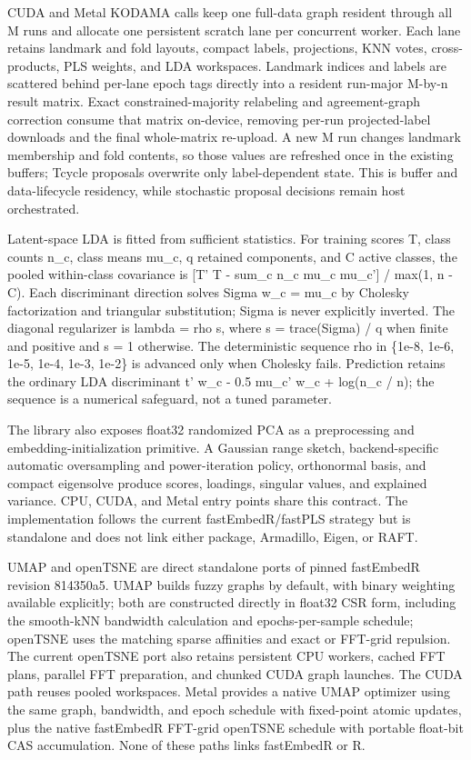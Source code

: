 \documentclass[twoside,11pt]{article}
\begin{document}
\begin{small}
CUDA and Metal KODAMA calls keep one full-data graph resident through all M runs and allocate one persistent scratch lane per concurrent worker. Each lane retains landmark and fold layouts, compact labels, projections, KNN votes, cross-products, PLS weights, and LDA workspaces. Landmark indices and labels are scattered behind per-lane epoch tags directly into a resident run-major M-by-n result matrix. Exact constrained-majority relabeling and agreement-graph correction consume that matrix on-device, removing per-run projected-label downloads and the final whole-matrix re-upload. A new M run changes landmark membership and fold contents, so those values are refreshed once in the existing buffers; Tcycle proposals overwrite only label-dependent state. This is buffer and data-lifecycle residency, while stochastic proposal decisions remain host orchestrated.

Latent-space LDA is fitted from sufficient statistics. For training scores T, class counts n\_c, class means mu\_c, q retained components, and C active classes, the pooled within-class covariance is [T' T - sum\_c n\_c mu\_c mu\_c'] / max(1, n - C). Each discriminant direction solves Sigma w\_c = mu\_c by Cholesky factorization and triangular substitution; Sigma is never explicitly inverted. The diagonal regularizer is lambda = rho s, where s = trace(Sigma) / q when finite and positive and s = 1 otherwise. The deterministic sequence rho in \{1e-8, 1e-6, 1e-5, 1e-4, 1e-3, 1e-2\} is advanced only when Cholesky fails. Prediction retains the ordinary LDA discriminant t' w\_c - 0.5 mu\_c' w\_c + log(n\_c / n); the sequence is a numerical safeguard, not a tuned parameter.

The library also exposes float32 randomized PCA as a preprocessing and embedding-initialization primitive. A Gaussian range sketch, backend-specific automatic oversampling and power-iteration policy, orthonormal basis, and compact eigensolve produce scores, loadings, singular values, and explained variance. CPU, CUDA, and Metal entry points share this contract. The implementation follows the current fastEmbedR/fastPLS strategy but is standalone and does not link either package, Armadillo, Eigen, or RAFT.

UMAP and openTSNE are direct standalone ports of pinned fastEmbedR revision 814350a5. UMAP builds fuzzy graphs by default, with binary weighting available explicitly; both are constructed directly in float32 CSR form, including the smooth-kNN bandwidth calculation and epochs-per-sample schedule; openTSNE uses the matching sparse affinities and exact or FFT-grid repulsion. The current openTSNE port also retains persistent CPU workers, cached FFT plans, parallel FFT preparation, and chunked CUDA graph launches. The CUDA path reuses pooled workspaces. Metal provides a native UMAP optimizer using the same graph, bandwidth, and epoch schedule with fixed-point atomic updates, plus the native fastEmbedR FFT-grid openTSNE schedule with portable float-bit CAS accumulation. None of these paths links fastEmbedR or R.


\end{small}
\end{document}
